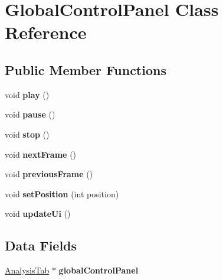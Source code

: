 \hypertarget{classGlobalControlPanel}{}\section{Global\+Control\+Panel Class Reference}
\label{classGlobalControlPanel}
\subsection*{Public Member Functions}
\begin{DoxyCompactItemize}
\item 
\hypertarget{classGlobalControlPanel_a6d58098c6cf63c241ed03bc797256bb1}{}void {\bfseries play} ()\label{classGlobalControlPanel_a6d58098c6cf63c241ed03bc797256bb1}

\item 
\hypertarget{classGlobalControlPanel_a7167f5c196fc5e167bfabde1a730e81d}{}void {\bfseries pause} ()\label{classGlobalControlPanel_a7167f5c196fc5e167bfabde1a730e81d}

\item 
\hypertarget{classGlobalControlPanel_a8c528baf37154d347366083f0f816846}{}void {\bfseries stop} ()\label{classGlobalControlPanel_a8c528baf37154d347366083f0f816846}

\item 
\hypertarget{classGlobalControlPanel_a365329da56f8b07f8c95027ba967bbc3}{}void {\bfseries next\+Frame} ()\label{classGlobalControlPanel_a365329da56f8b07f8c95027ba967bbc3}

\item 
\hypertarget{classGlobalControlPanel_a3c96ed37c70ebc0b32c527a04e1536d1}{}void {\bfseries previous\+Frame} ()\label{classGlobalControlPanel_a3c96ed37c70ebc0b32c527a04e1536d1}

\item 
\hypertarget{classGlobalControlPanel_a1aa68f77243229daea38d59bc5145d35}{}void {\bfseries set\+Position} (int position)\label{classGlobalControlPanel_a1aa68f77243229daea38d59bc5145d35}

\item 
\hypertarget{classGlobalControlPanel_ae13c7f95f1ceda0fec18d18c3d7619f6}{}void {\bfseries update\+Ui} ()\label{classGlobalControlPanel_ae13c7f95f1ceda0fec18d18c3d7619f6}

\end{DoxyCompactItemize}
\subsection*{Data Fields}
\begin{DoxyCompactItemize}
\item 
\hypertarget{classGlobalControlPanel_a37616793d8a82fbed446c4e7f1d655a0}{}\hyperlink{classAnalysisTab}{Analysis\+Tab} $\ast$ {\bfseries global\+Control\+Panel}\label{classGlobalControlPanel_a37616793d8a82fbed446c4e7f1d655a0}

\end{DoxyCompactItemize}
